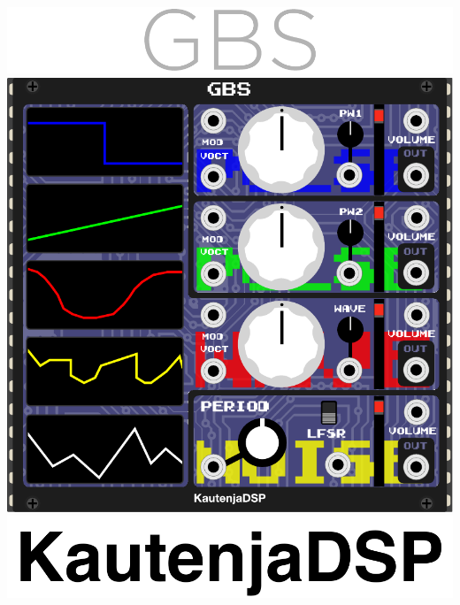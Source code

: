 \documentclass[12pt,a4paper]{article}
\begin{document}

\thispagestyle{empty}
\vspace*{\fill}
\begin{center}
\includegraphics{GBS-Logo}
\linebreak\linebreak\linebreak\linebreak
\includegraphics{GBS-Module}
\linebreak\linebreak\linebreak\linebreak
\includegraphics{KautenjaDSP}
\end{center}
\vspace*{\fill}
\clearpage
\end{document}
